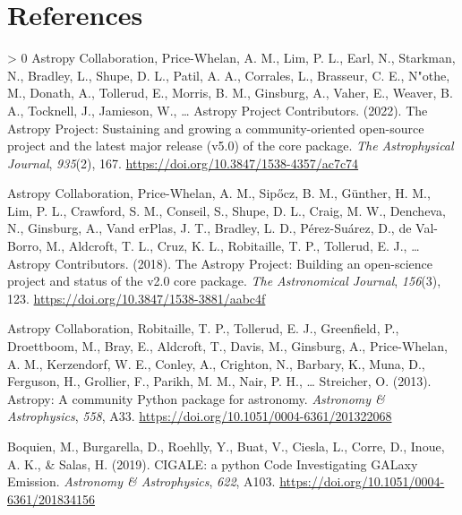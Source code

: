\documentclass[10pt,a4paper,onecolumn]{article}
\newlength{\cslhangindent}
\newenvironment{CSLReferences}[3]%
{%
	\setlength{\parindent}{0pt}
	\ifodd #1 \everypar{\setlength{\hangindent}{\cslhangindent}}\ignorespaces\fi
	\ifnum #2 > 0
	\setlength{\parskip}{#2\baselineskip}
	\fi
}{}
\begin{document}
	\hypertarget{references}{%
		\section*{References}\label{references}}
	
	\hypertarget{refs}{}
	\begin{CSLReferences}{1}{0}
		\leavevmode\hypertarget{ref-astropy:2022}{}%
		Astropy Collaboration, Price-Whelan, A. M., Lim, P. L., Earl, N.,
		Starkman, N., Bradley, L., Shupe, D. L., Patil, A. A., Corrales, L.,
		Brasseur, C. E., N"othe, M., Donath, A., Tollerud, E., Morris, B. M.,
		Ginsburg, A., Vaher, E., Weaver, B. A., Tocknell, J., Jamieson, W.,
		\ldots{} Astropy Project Contributors. (2022). The {Astropy Project}:
		Sustaining and growing a community-oriented open-source project and the
		latest major release (v5.0) of the core package. \emph{The Astrophysical
			Journal}, \emph{935}(2), 167.
		\url{https://doi.org/10.3847/1538-4357/ac7c74}
		
		\leavevmode\hypertarget{ref-astropy:2018}{}%
		Astropy Collaboration, Price-Whelan, A. M., Sipőcz, B. M., Günther, H.
		M., Lim, P. L., Crawford, S. M., Conseil, S., Shupe, D. L., Craig, M.
		W., Dencheva, N., Ginsburg, A., Vand erPlas, J. T., Bradley, L. D.,
		P\'erez-Su\'arez, D., de Val-Borro, M., Aldcroft, T. L., Cruz, K. L.,
		Robitaille, T. P., Tollerud, E. J., \ldots{} Astropy Contributors.
		(2018). The {Astropy Project}: Building an open-science project and
		status of the v2.0 core package. \emph{The Astronomical Journal},
		\emph{156}(3), 123. \url{https://doi.org/10.3847/1538-3881/aabc4f}
		
		\leavevmode\hypertarget{ref-astropy:2013}{}%
		Astropy Collaboration, Robitaille, T. P., Tollerud, E. J., Greenfield,
		P., Droettboom, M., Bray, E., Aldcroft, T., Davis, M., Ginsburg, A.,
		Price-Whelan, A. M., Kerzendorf, W. E., Conley, A., Crighton, N.,
		Barbary, K., Muna, D., Ferguson, H., Grollier, F., Parikh, M. M., Nair,
		P. H., \ldots{} Streicher, O. (2013). Astropy: A community {Python}
		package for astronomy. \emph{Astronomy \& Astrophysics}, \emph{558},
		A33. \url{https://doi.org/10.1051/0004-6361/201322068}
		
		\leavevmode\hypertarget{ref-boquien+19}{}%
		Boquien, M., Burgarella, D., Roehlly, Y., Buat, V., Ciesla, L., Corre,
		D., Inoue, A. K., \& Salas, H. (2019). {CIGALE: a python Code
			Investigating GALaxy Emission}. \emph{Astronomy \& Astrophysics},
		\emph{622}, A103. \url{https://doi.org/10.1051/0004-6361/201834156}
		

\end{CSLReferences}
\end{document}
